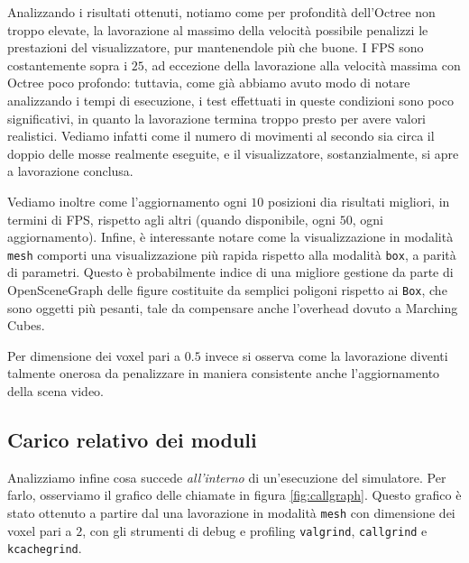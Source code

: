 Analizzando i risultati ottenuti, notiamo come per profondità dell'Octree non troppo elevate, la lavorazione al massimo della velocità possibile penalizzi le prestazioni del visualizzatore, pur mantenendole più che buone. I FPS sono costantemente sopra i $25$, ad eccezione della lavorazione alla velocità massima con Octree poco profondo: tuttavia, come già abbiamo avuto modo di notare analizzando i tempi di esecuzione, i test effettuati in queste condizioni sono poco significativi, in quanto la lavorazione termina troppo presto per avere valori realistici. Vediamo infatti come il numero di movimenti al secondo sia circa il doppio delle mosse realmente eseguite, e il visualizzatore, sostanzialmente, si apre a lavorazione conclusa.

Vediamo inoltre come l'aggiornamento ogni $10$ posizioni dia risultati migliori, in termini di FPS, rispetto agli altri (quando disponibile, ogni $50$, ogni aggiornamento). Infine, è interessante notare come la visualizzazione in modalità \texttt{mesh} comporti una visualizzazione più rapida rispetto alla modalità \texttt{box}, a parità di parametri. Questo è probabilmente indice di una migliore gestione da parte di OpenSceneGraph delle figure costituite da semplici poligoni rispetto ai \texttt{Box}, che sono oggetti più pesanti, tale da compensare anche l'overhead dovuto a Marching Cubes.

Per dimensione dei voxel pari a $0.5$ invece si osserva come la lavorazione diventi talmente onerosa da penalizzare in maniera consistente anche l'aggiornamento della scena video.

\subsection{Carico relativo dei moduli}
Analizziamo infine cosa succede \textit{all'interno} di un'esecuzione del simulatore. Per farlo, osserviamo il grafico delle chiamate in figura \ref{fig:callgraph}. Questo grafico è stato ottenuto a partire dal una lavorazione in modalità \texttt{mesh} con dimensione dei voxel pari a $2$, con gli strumenti di debug e profiling \texttt{valgrind}, \texttt{callgrind} e \texttt{kcachegrind}.

